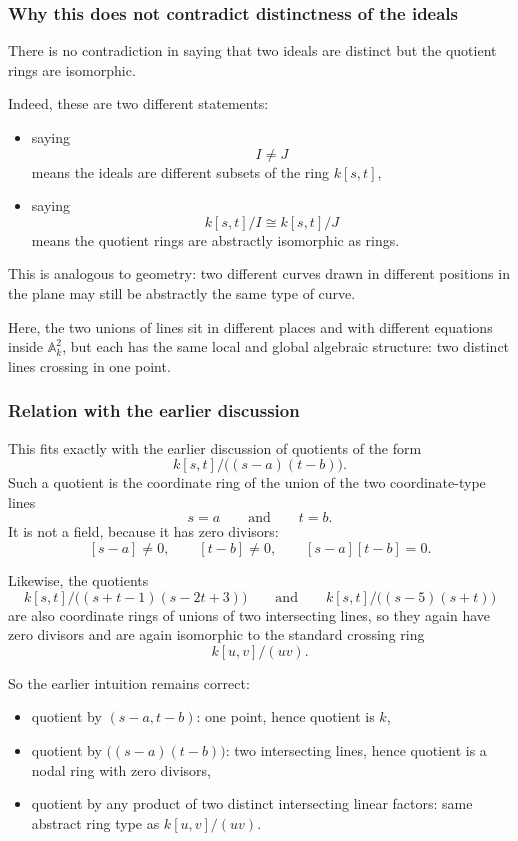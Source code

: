 \documentclass[12pt,a4paper]{article}
\theoremstyle{notespace}
\theoremstyle{definition}
\begin{document}
\subsubsection{Why this does not contradict distinctness of the ideals}

There is no contradiction in saying that two ideals are distinct but the quotient rings are isomorphic.

Indeed, these are two different statements:

\begin{itemize}
	\item saying
	\[
	I\neq J
	\]
	means the ideals are different subsets of the ring \(k[s,t]\),
	
	\item saying
	\[
	k[s,t]/I \cong k[s,t]/J
	\]
	means the quotient rings are abstractly isomorphic as rings.
\end{itemize}

This is analogous to geometry: two different curves drawn in different positions in the plane may still be abstractly the same type of curve.

Here, the two unions of lines sit in different places and with different equations inside \(\mathbb{A}^2_k\), but each has the same local and global algebraic structure: two distinct lines crossing in one point.

\subsubsection{Relation with the earlier discussion}

This fits exactly with the earlier discussion of quotients of the form
\[
k[s,t]/\bigl((s-a)(t-b)\bigr).
\]
Such a quotient is the coordinate ring of the union of the two coordinate-type lines
\[
s=a
\qquad\text{and}\qquad
t=b.
\]
It is not a field, because it has zero divisors:
\[
[s-a]\neq 0,
\qquad
[t-b]\neq 0,
\qquad
[s-a][t-b]=0.
\]

Likewise, the quotients
\[
k[s,t]/\bigl((s+t-1)(s-2t+3)\bigr)
\qquad\text{and}\qquad
k[s,t]/\bigl((s-5)(s+t)\bigr)
\]
are also coordinate rings of unions of two intersecting lines, so they again have zero divisors and are again isomorphic to the standard crossing ring
\[
k[u,v]/(uv).
\]

So the earlier intuition remains correct:

\begin{itemize}
	\item quotient by \((s-a,t-b)\): one point, hence quotient is \(k\),
	\item quotient by \(\bigl((s-a)(t-b)\bigr)\): two intersecting lines, hence quotient is a nodal ring with zero divisors,
	\item quotient by any product of two distinct intersecting linear factors: same abstract ring type as \(k[u,v]/(uv)\).
\end{itemize}
\end{document}
